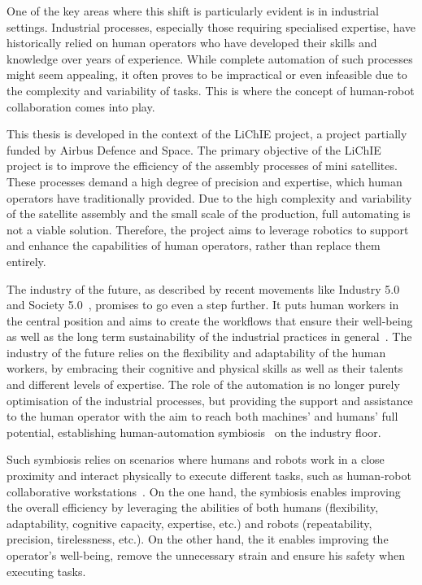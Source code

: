 One of the key areas where this shift is particularly evident is in industrial settings. Industrial processes, especially those requiring specialised expertise, have historically relied on human operators who have developed their skills and knowledge over years of experience. While complete automation of such processes might seem appealing, it often proves to be impractical or even infeasible due to the complexity and variability of tasks. This is where the concept of human-robot collaboration comes into play.

This thesis is developed in the context of the LiChIE project, a project partially funded by Airbus Defence and Space. The primary objective of the LiChIE project is to improve the efficiency of the assembly processes of mini satellites. These processes demand a high degree of precision and expertise, which human operators have traditionally provided. Due to the high complexity and variability of the satellite assembly and the small scale of the production, full automating is not a viable solution. Therefore, the project aims to leverage robotics to support and enhance the capabilities of human operators, rather than replace them entirely.

The industry of the future, as described by recent movements like Industry 5.0~\cite{MADDIKUNTA2022ind50} and Society 5.0~\cite{Huang2022society}, promises to go even a step further. 
It puts human workers in the central position and aims to create the workflows that ensure their well-being as well as the long term sustainability of the industrial practices in general~\cite{XU2021ind50}. The industry of the future relies on the flexibility and adaptability of the human workers, by embracing their cognitive and physical skills as well as their talents and different levels of expertise. The role of the automation is no longer purely optimisation of the industrial processes, but providing the support and assistance to the human operator with the aim to reach both machines' and humans' full potential, establishing human-automation symbiosis~\cite{LENG2022ind50} on the industry floor.

Such symbiosis relies on scenarios where humans and robots work in a close proximity and interact physically to execute different tasks, such as human-robot collaborative workstations~\cite{SIMOES2022workplace}. On the one hand, the symbiosis enables improving the overall efficiency by leveraging the abilities of both humans (flexibility, adaptability, cognitive capacity, expertise, etc.) and robots (repeatability, precision, tirelessness, etc.). On the other hand, the it enables improving the operator's well-being, remove the unnecessary strain and ensure his safety when executing tasks. 

